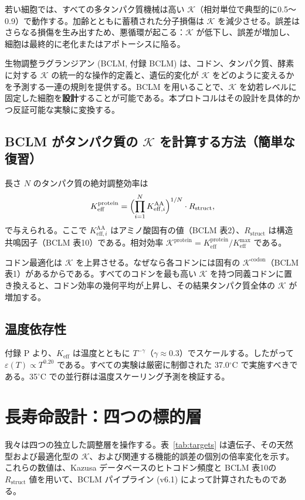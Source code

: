 \documentclass[12pt,a4paper]{ltjsarticle}
\newcommand{\REL}{\mathcal{K}}          %
\begin{document}
	若い細胞では、すべての多タンパク質機械は高い \(\REL\)（相対単位で典型的に0.5～0.9）で動作する。加齢とともに蓄積された分子損傷は \(\REL\) を減少させる。誤差はさらなる損傷を生み出すため、悪循環が起こる：\(\REL\) が低下し、誤差が増加し、細胞は最終的に老化またはアポトーシスに陥る。
	
	生物調整ラグランジアン (BCLM, 付録 BCLM) は、コドン、タンパク質、酵素に対する \(\REL\) の統一的な操作的定義と、遺伝的変化が \(\REL\) をどのように変えるかを予測する一連の規則を提供する。BCLM を用いることで、\(\REL\) を幼若レベルに固定した細胞を\textbf{設計}することが可能である。本プロトコルはその設計を具体的かつ反証可能な実験に変換する。
	
	\subsection{BCLM がタンパク質の \(\REL\) を計算する方法（簡単な復習）}
	長さ \(N\) のタンパク質の絶対調整効率は
	\[
	K_{\mathrm{eff}}^{\mathrm{protein}} = \Bigl( \prod_{i=1}^{N} K_{\mathrm{eff},i}^{\mathrm{AA}} \Bigr)^{1/N} \cdot R_{\mathrm{struct}},
	\]
	で与えられる。ここで \(K_{\mathrm{eff},i}^{\mathrm{AA}}\) はアミノ酸固有の値（BCLM 表2）、\(R_{\mathrm{struct}}\) は構造共鳴因子（BCLM 表10）である。相対効率 \(\REL^{\mathrm{protein}} = K_{\mathrm{eff}}^{\mathrm{protein}}/K_{\mathrm{eff}}^{\max}\) である。
	
	コドン最適化は \(\REL\) を上昇させる。なぜなら各コドンには固有の \(\REL^{\mathrm{codon}}\)（BCLM 表1）があるからである。すべてのコドンを最も高い \(\REL\) を持つ同義コドンに置き換えると、コドン効率の幾何平均が上昇し、その結果タンパク質全体の \(\REL\) が増加する。
	
	\subsection{温度依存性}
	付録 P より、\(K_{\mathrm{eff}}\) は温度とともに \(T^{-\gamma}\)（\(\gamma\approx0.3\)）でスケールする。したがって \(\varepsilon(T) \propto T^{0.20}\) である。すべての実験は厳密に制御された 37.0\(^\circ\)C で実施すべきである。35\(^\circ\)C での並行群は温度スケーリング予測を検証する。
	
	\section{長寿命設計：四つの標的層}
	\label{sec:layers}
	我々は四つの独立した調整層を操作する。表~\ref{tab:targets} は遺伝子、その天然型および最適化型の \(\REL\)、および関連する機能的誤差の個別の倍率変化を示す。これらの数値は、Kazusa データベースのヒトコドン頻度と BCLM 表10の \(R_{\mathrm{struct}}\) 値を用いて、BCLM パイプライン (v6.1) によって計算されたものである。
	
\end{document}
